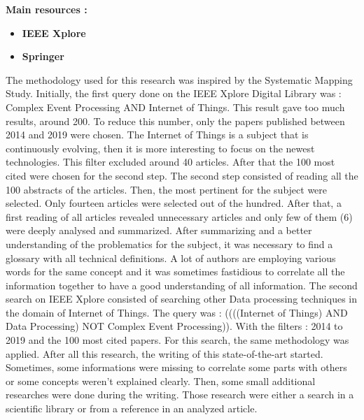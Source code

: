 \documentclass[11pt]{article}
\begin{document}
\textbf{Main resources :}
\begin{itemize}
	\item \textbf{IEEE Xplore} 
	\item \textbf{Springer} 
\end{itemize}

The methodology used for this research was inspired by the Systematic Mapping Study. \cite{sms} Initially, the first query done on the IEEE Xplore Digital Library was : Complex Event Processing AND Internet of Things. This result gave too much results, around 200. To reduce this number, only the papers published between 2014 and 2019 were chosen. The Internet of Things is a subject that is continuously evolving, then it is more interesting to focus on the newest technologies. This filter excluded around 40 articles. After that the 100 most cited were chosen for the second step.
\newline
\newline
The second step consisted of reading all the 100 abstracts of the articles. Then, the most pertinent for the subject were selected. Only fourteen articles were selected out of the hundred. After that, a first reading of all articles revealed unnecessary articles and only few of them (6) were deeply analysed and summarized. After summarizing and a better understanding of the problematics for the subject, it was necessary to find a glossary \cite{glossary} with all technical definitions. A lot of authors are employing various words for the same concept and it was sometimes fastidious to correlate all the information together to have a good understanding of all information.  
\newline
\newline
The second search on IEEE Xplore consisted of searching other Data processing techniques in the domain of Internet of Things. The query was : ((((Internet of Things) AND Data Processing) NOT Complex Event Processing)). With the filters :  2014 to 2019 and the 100 most cited papers. For this search, the same methodology was applied.
\newline
\newline
After all this research, the writing of this state-of-the-art started. Sometimes, some informations were missing to correlate some parts with others or some concepts weren't explained clearly. Then, some small additional researches were done during the writing. Those research were either a search in a scientific library or from a reference in an analyzed article.


\newpage
\listoffigures
\nocite{*}
\printbibliography
\end{document}
